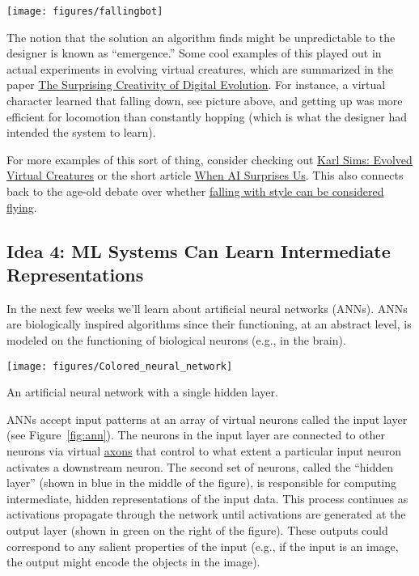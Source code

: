 \documentclass[assignment01_Solutions]{subfiles}
\begin{document}
\begin{center}
\texttt{[image: figures/fallingbot]}
\end{center}

The notion that the solution an algorithm finds might be unpredictable to the designer is known as ``emergence.''  Some cool examples of this played out in actual experiments in evolving virtual creatures, which are summarized in the paper \href{https://arxiv.org/pdf/1803.03453.pdf}{The Surprising Creativity of Digital Evolution}.  For instance, a virtual character learned that falling down, see picture above, and getting up was more efficient for locomotion than constantly hopping (which is what the designer had intended the system to learn).

For more examples of this sort of thing, consider checking out \href{https://www.youtube.com/watch?v=bBt0imn77Zg}{Karl Sims: Evolved Virtual Creatures} or the short article \href{https://aiweirdness.com/post/172894792687/when-algorithms-surprise-us}{When AI Surprises Us}.  This also connects back to the age-old debate over whether \href{https://www.youtube.com/watch?v=DwN6efmhp7E}{falling with style can be considered flying}.


\subsection*{Idea 4: ML Systems Can Learn Intermediate Representations}

In the next few weeks we'll learn about artificial neural networks (ANNs).  ANNs are biologically inspired algorithms since their functioning, at an abstract level, is modeled on the functioning of biological neurons (e.g., in the brain).

\begin{marginfigure}
\texttt{[image: figures/Colored\_neural\_network]}
\caption{An artificial neural network with a single hidden layer.}\label{fig:ann}
\end{marginfigure}
ANNs accept input patterns at an array of virtual neurons called the input layer (see Figure~\ref{fig:ann}).  The neurons in the input layer are connected to other neurons via virtual \href{https://en.wikipedia.org/wiki/Axon}{axons} that control to what extent a particular input neuron activates a downstream neuron.  The second set of neurons, called the ``hidden layer'' (shown in blue in the middle of the figure), is responsible for computing intermediate, hidden representations of the input data.  This process continues as activations propagate through the network until activations are generated at the output layer (shown in green on the right of the figure). These outputs could correspond to any salient properties of the input (e.g., if the input is an image, the output might encode the objects in the image).
\end{document}
